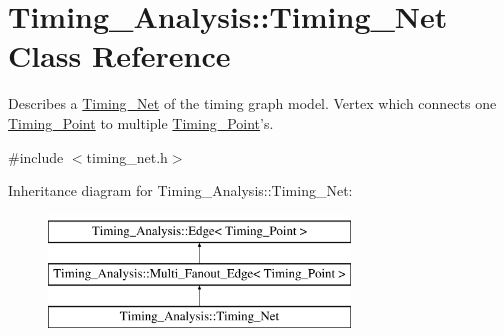 \hypertarget{classTiming__Analysis_1_1Timing__Net}{\section{Timing\-\_\-\-Analysis\-:\-:Timing\-\_\-\-Net Class Reference}
\label{classTiming__Analysis_1_1Timing__Net}
}


Describes a \hyperlink{classTiming__Analysis_1_1Timing__Net}{Timing\-\_\-\-Net} of the timing graph model. Vertex which connects one \hyperlink{classTiming__Analysis_1_1Timing__Point}{Timing\-\_\-\-Point} to multiple \hyperlink{classTiming__Analysis_1_1Timing__Point}{Timing\-\_\-\-Point}'s.  




{\ttfamily \#include $<$timing\-\_\-net.\-h$>$}

Inheritance diagram for Timing\-\_\-\-Analysis\-:\-:Timing\-\_\-\-Net\-:\begin{figure}[H]
\begin{center}
\leavevmode
\includegraphics[height=3.000000cm]{classTiming__Analysis_1_1Timing__Net}
\end{center}
\end{figure}
